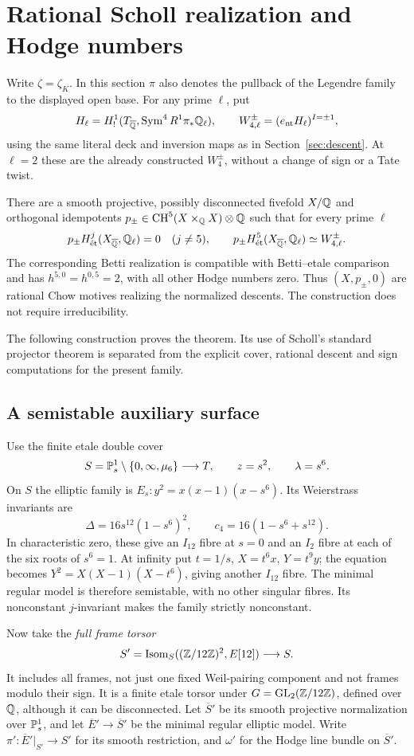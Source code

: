 \section{Rational Scholl realization and Hodge numbers}\label{sec:scholl}
Write $\zeta=\zeta_K$. In this section $\pi$ also denotes the pullback
of the Legendre family to the displayed open base.
For any prime $\ell$, put
\[
 H_\ell=H^1_!(T_{\overline{\mathbb Q}},\operatorname{Sym}^4 R^1\pi_*\mathbb Q_\ell),\qquad
 W_{4,\ell}^{\pm}=(e_{\mathrm{nt}}H_\ell)^{I=\pm1},
\]
using the same literal deck and inversion maps as in
Section~\ref{sec:descent}. At $\ell=2$ these are the already constructed
$W_4^\pm$, without a change of sign or a Tate twist.

\begin{theorem}\label{thm:scholl-realization}
There are a smooth projective, possibly disconnected fivefold $X/\mathbb Q$
and orthogonal idempotents
$p_\pm\in\operatorname{CH}^5(X\times_\mathbb Q X)\otimes\mathbb Q$ such that for every prime $\ell$
\[
 p_\pm H^j_{\mathrm{\acute et}}(X_{\overline{\mathbb Q}},\mathbb Q_\ell)=0\quad(j\ne5),\qquad
 p_\pm H^5_{\mathrm{\acute et}}(X_{\overline{\mathbb Q}},\mathbb Q_\ell)\simeq W_{4,\ell}^\pm.
\]
The corresponding Betti realization is compatible with Betti--etale
comparison and has $h^{5,0}=h^{0,5}=2$, with all other Hodge numbers zero.
Thus $(X,p_\pm,0)$ are rational Chow motives realizing the normalized
descents. The construction does not require irreducibility.
\end{theorem}
The following construction proves the theorem. Its use of Scholl's
standard projector theorem is separated from the explicit cover, rational
descent and sign computations for the present family.

\subsection{A semistable auxiliary surface}
Use the finite etale double cover
\[
S=\mathbb P^1_s\setminus\{0,\infty,\mu_6\}\longrightarrow T,
\qquad z=s^2,\qquad \lambda=s^6.
\]
On $S$ the elliptic family is $E_s:y^2=x(x-1)(x-s^6)$. Its Weierstrass
invariants are
\[
\Delta=16s^{12}(1-s^6)^2,\qquad c_4=16(1-s^6+s^{12}).
\]
In characteristic zero, these give an $I_{12}$ fibre at $s=0$ and an $I_2$
fibre at each of the six roots of $s^6=1$. At infinity put
$t=1/s$, $X=t^6x$, $Y=t^9y$; the equation becomes
$Y^2=X(X-1)(X-t^6)$, giving another $I_{12}$ fibre.
The minimal regular model is therefore semistable, with no other singular
fibres. Its nonconstant $j$-invariant makes the family strictly nonconstant.

Now take the \emph{full frame torsor}
\[
S'=\operatorname{Isom}_S((\mathbb Z/12\mathbb Z)^2,E[12])\longrightarrow S.
\]
It includes all frames, not just one fixed Weil-pairing component and not
frames modulo their sign. It is a finite etale torsor under
$G=\operatorname{GL}_2(\mathbb Z/12\mathbb Z)$, defined over $\mathbb Q$, although it can be disconnected.
Let $\overline S'$ be its smooth projective normalization over $\mathbb P^1_s$,
and let $\overline E'\to\overline S'$ be the minimal regular elliptic model.
Write $\pi':\overline E'|_{S'}\to S'$ for its smooth restriction, and
$\omega'$ for the Hodge line bundle on $\overline S'$.

